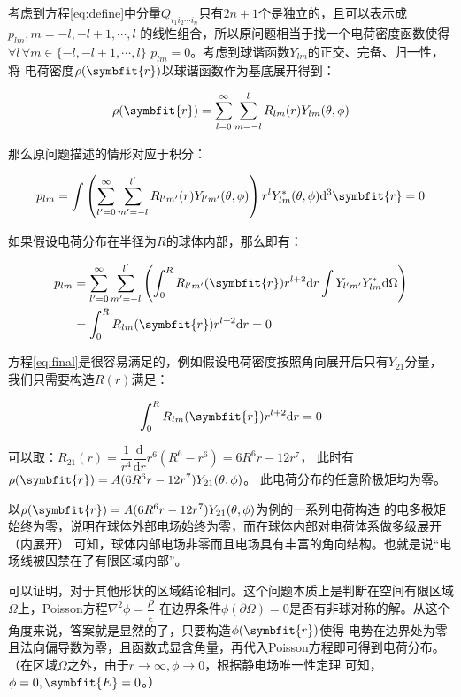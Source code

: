 \documentclass[11pt,a4paper]{ctexart}
\newcommand{\dd}{\mathrm{d}}
\begin{document}
考虑到方程\eqref{eq:define}中分量$Q_{i_1i_2\cdots i_n}$只有$2n+1$个是独立的，且可以表示成$p_{lm},m=-l,-l+1,\cdots,l$
的线性组合，所以原问题相当于找一个电荷密度函数使得$\forall l\,\forall m\in\{-l,-l+1,\cdots,l\}\,\,p_{lm}=0$。考虑到球谐函数$Y_{lm}$的正交、完备、归一性，将
电荷密度$\rho(\symbfit{r})$以球谐函数作为基底展开得到：

\begin{equation}
    \rho(\symbfit{r})=\sum_{l=0}^{\infty}\sum_{m=-l}^{l}R_{lm}(r)Y_{lm}(\theta,\phi)
\end{equation}

那么原问题描述的情形对应于积分：

\begin{equation}
    p_{lm}=\int\left(\sum_{l'=0}^{\infty}\sum_{m'=-l}^{l'}R_{l'm'}(r)Y_{l'm'}(\theta,\phi)\right)r^lY_{lm}^*(\theta,\phi)\dd^3\symbfit{r}=0
\end{equation}

如果假设电荷分布在半径为$R$的球体内部，那么即有：

\begin{align}
    p_{lm}&=\sum_{l'=0}^{\infty}\sum_{m'=-l}^{l'}\left(\int_{0}^{R} R_{l'm'}(\symbfit{r})r^{l+2}\dd r\int Y_{l'm'}Y_{lm}^*\dd\Omega\right) \notag \\
    &=\int_{0}^{R} R_{lm}(\symbfit{r})r^{l+2}\dd r=0
    \label{eq:final}
\end{align}

方程\eqref{eq:final}是很容易满足的，例如假设电荷密度按照角向展开后只有$Y_{21}$分量，我们只需要构造$R(r)$满足：

\begin{equation}
    \int_{0}^{R} R_{lm}(\symbfit{r})r^{l+2}\dd r=0
\end{equation}

可以取：$R_{21}(r)=\dfrac{1}{r^4}\dfrac{\dd}{\dd r}r^6(R^6-r^6)=6R^6r-12r^{7}$，
此时有$\rho(\symbfit{r})=A(6R^6r-12r^{7})Y_{21}(\theta,\phi)$。
此电荷分布的任意阶极矩均为零。

\bigskip

以$\rho(\symbfit{r})=A(6R^6r-12r^{7})Y_{21}(\theta,\phi)$为例的一系列电荷构造
的电多极矩始终为零，说明在球体外部电场始终为零，而在球体内部对电荷体系做多级展开（内展开）
可知，球体内部电场非零而且电场具有丰富的角向结构。也就是说“电场线被囚禁在了有限区域内部”。

可以证明，对于其他形状的区域结论相同。这个问题本质上是判断在空间有限区域$\Omega$上，Poisson方程$\nabla^2\phi=\dfrac{\rho}{\epsilon}$
在边界条件$\phi(\partial\Omega)=0$是否有非球对称的解。从这个角度来说，答案就是显然的了，只要构造$\phi(\symbfit{r})$使得
电势在边界处为零且法向偏导数为零，且函数式显含角量，再代入Poisson方程即可得到电荷分布。（在区域$\Omega$之外，由于$r\to \infty,\phi \to 0$，根据静电场唯一性定理
可知，$\phi=0,\symbfit{E}=0$。）
\end{document}
